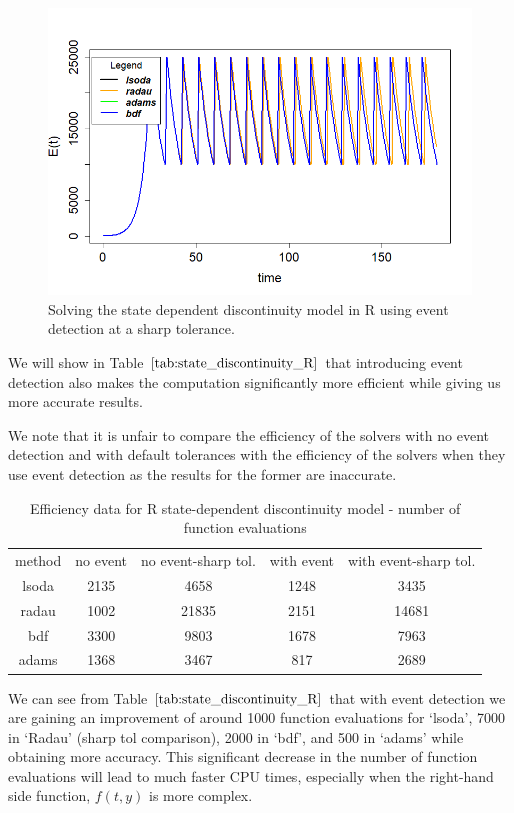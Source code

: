 \begin{figure}[H]
\centering
\includegraphics[width=0.7\linewidth]{./figures/solve_state_discontinuity_sharp_R}
\caption{Solving the state dependent discontinuity model in R using event detection at a sharp tolerance.}
\label{fig:solve_state_discontinuity_sharp_R}
\end{figure}

We will show in Table $\ref{tab:state_discontinuity_R}$ that introducing event detection also makes the computation significantly more efficient while giving us more accurate results.

We note that it is unfair to compare the efficiency of the solvers with no event detection and with default tolerances with the efficiency of the solvers when they use event detection as the results for the former are inaccurate.

\begin{table}[h]
\caption {Efficiency data for R state-dependent discontinuity model - number of function evaluations} 
\label{tab:state_discontinuity_R}
\begin{center}
\begin{tabular}{ c c c c c } 
method & no event & no event-sharp tol. & with event & with event-sharp tol.\\ 
lsoda & 2135 & 4658 & 1248 & 3435 \\
radau & 1002 & 21835 & 2151 & 14681\\
bdf & 3300 & 9803 & 1678 & 7963\\
adams & 1368 & 3467 & 817 & 2689\\
\end{tabular}
\end{center}
\end{table}

We can see from Table $\ref{tab:state_discontinuity_R}$ that with event detection we are gaining an improvement of around 1000 function evaluations for `lsoda', 7000 in `Radau' (sharp tol comparison), 2000 in `bdf', and 500 in `adams' while obtaining more accuracy. This significant decrease in the number of function evaluations will lead to much faster CPU times, especially when the right-hand side function, $f(t, y)$ is more complex.

